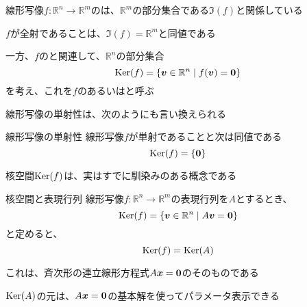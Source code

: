 \documentclass[../../../topic_linear-algebra]{subfiles}
\begin{document}
線形写像$f\colon \mathbb{R}^n \to \mathbb{R}^m$のは、$\mathbb{R}^m$の部分集合である$\Im(f)$と関係している

$f$が全射であることは、$\Im(f) = \mathbb{R}^m$と同値である

\sectionline

一方、$f$のと関連して、$\mathbb{R}^n$の部分集合
\begin{equation*}
  \operatorname{Ker}(f) = \{ \vb*{v} \in \mathbb{R}^n \mid f(\vb*{v}) = \vb*{0} \}
\end{equation*}
を考え、これを$f$のあるいはと呼ぶ

\br

線形写像の単射性は、次のようにも言い換えられる

\begin{theorem}{線形写像の単射性}
  線形写像$f$が単射であることと次は同値である
  \begin{equation*}
    \operatorname{Ker}(f) = \{ \vb*{0} \}
  \end{equation*}
\end{theorem}

\sectionline

核空間$\operatorname{Ker}(f)$は、実はすでに馴染みのある概念である

\begin{theorem}{核空間と表現行列}
  線形写像$f\colon \mathbb{R}^n \to \mathbb{R}^m$の表現行列を$A$とするとき、
  \begin{equation*}
    \operatorname{Ker}(f) = \{ \vb*{v} \in \mathbb{R}^n \mid A\vb*{v} = \vb*{0} \}
  \end{equation*}
  と定めると、
  \begin{equation*}
    \operatorname{Ker}(f) = \operatorname{Ker}(A)
  \end{equation*}
\end{theorem}

これは、斉次形の連立線形方程式$A\vb*{x} = \vb*{0}$のそのものである

\br

$\operatorname{Ker}(A)$の元は、$A\vb*{x} = \vb*{0}$の基本解を使ってパラメータ表示できる
\end{document}
